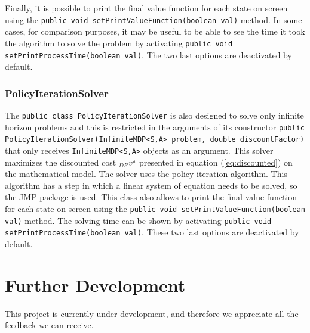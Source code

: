 \documentclass[11pt]{article}
\begin{document}
Finally, it is possible to  print the final value function for each state on screen using the \lstinline!public void setPrintValueFunction(boolean val)! method. In some cases, for comparison purposes, it may be useful to be able to see the time it took the algorithm to solve the problem by activating \lstinline!public void setPrintProcessTime(boolean val)!. The two last options are deactivated by default.


\subsubsection{PolicyIterationSolver}

The \lstinline!public class PolicyIterationSolver! is also designed to solve only infinite horizon problems and this is restricted in the arguments of its constructor \lstinline!public PolicyIterationSolver(InfiniteMDP<S,A> problem, double discountFactor)! that only receives \lstinline!InfiniteMDP<S,A>! objects as an argument. This solver maximizes the discounted cost ${}_{DR}v^{\pi}$ presented in equation (\ref{eq:discounted}) on the mathematical model.
The solver uses the policy iteration algorithm. This algorithm has a step in which a linear system of equation needs to be solved, so the JMP\cite{bjorn} package is used. This class also allows to print the final value function for each state on screen using the \lstinline!public void setPrintValueFunction(boolean val)! method. The solving time can be shown by activating \lstinline!public void setPrintProcessTime(boolean val)!. These two last options are deactivated by default.


\section{Further Development}

This project is currently under development, and therefore we appreciate all the feedback we can receive.
\end{document}
